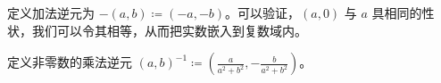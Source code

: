 定义加法逆元为 $-(a,b) \coloneqq  (-a,-b)$。可以验证，$(a,0)$ 与 $a$ 具相同的性状，我们可以令其相等，从而把实数嵌入到复数域内。

定义非零数的乘法逆元 $(a,b)^{-1} \coloneqq  \left(\frac{a}{a^2+b^2},-\frac{b}{a^2+b^2}\right)$。









%
%
%
%
%
%
%
%
%	
%	
%
%
%
%

